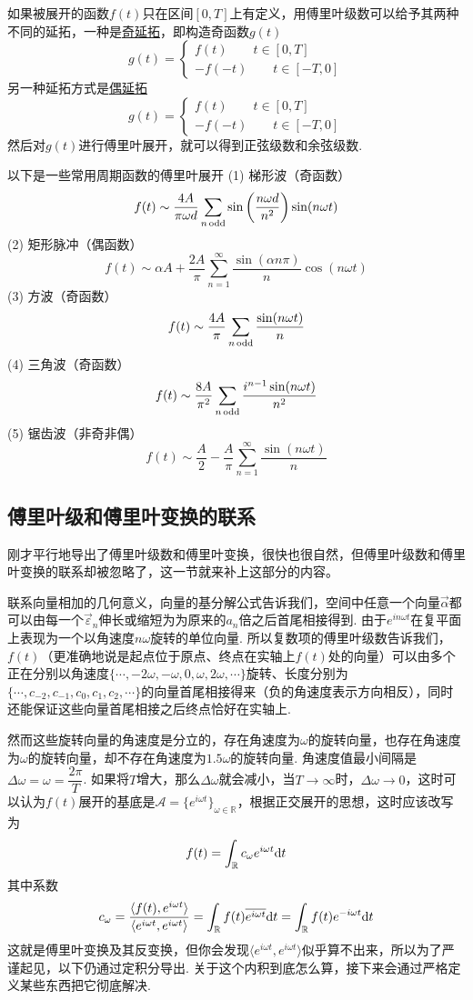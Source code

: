 如果被展开的函数\(f(t)\)只在区间\([0,T]\)上有定义，用傅里叶级数可以给予其两种不同的延拓，一种是\uline{奇延拓}，即构造奇函数\(g(t)\)
\[g(t)=\begin{cases} f(t) \qquad t\in[0,T] \\ -f(-t) \qquad t \in [-T,0]\end{cases}\]
另一种延拓方式是\uline{偶延拓}
\[g(t)=\begin{cases} f(t) \qquad t\in[0,T] \\ -f(-t) \qquad t \in [-T,0]\end{cases}\]
然后对\(g(t)\)进行傅里叶展开，就可以得到正弦级数和余弦级数.

以下是一些常用周期函数的傅里叶展开
\newline
(1) 梯形波（奇函数）
\[f(t)\sim\frac{4A}{\pi\omega d}\sum_{n\,{\rm odd}}\sin\left(\frac{n\omega d}{n^2}\right)\sin(n\omega t)\]
(2) 矩形脉冲（偶函数）
\[f(t)\sim\alpha A + \frac{2A}{\pi}\sum_{n=1}^{\infty}\frac{\sin(\alpha n \pi)}{n} \cos(n\omega t)\]
(3) 方波（奇函数）
\[f(t) \sim \frac{4A}{\pi}\sum_{n\,{\rm odd}} \frac{\sin(n\omega t)}{n}\]
(4) 三角波（奇函数）
\[f(t) \sim \frac{8A}{\pi^2}\sum_{n\,{\rm odd}}\frac{i^{n-1}\sin(n\omega t)}{n^2}\]
(5) 锯齿波（非奇非偶）
\[f(t) \sim \frac{A}{2}-\frac{A}{\pi}\sum_{n=1}^{\infty} \frac{\sin(n\omega t)}{n}\]


\subsection{傅里叶级和傅里叶变换的联系}

刚才平行地导出了傅里叶级数和傅里叶变换，很快也很自然，但傅里叶级数和傅里叶变换的联系却被忽略了，这一节就来补上这部分的内容。

联系向量相加的几何意义，向量的基分解公式告诉我们，空间中任意一个向量\(\vec{\alpha}\)都可以由每一个\(\vec{\varepsilon}_n\)伸长或缩短为为原来的\(a_n\)倍之后首尾相接得到. 由于\(e^{in\omega t}\)在复平面上表现为一个以角速度\(n\omega\)旋转的单位向量. 所以复数项的傅里叶级数告诉我们，\(f(t)\)（更准确地说是起点位于原点、终点在实轴上\(f(t)\)处的向量）可以由多个正在分别以角速度\(\{\cdots, -2\omega, -\omega, 0, \omega, 2\omega, \cdots\}\)旋转、长度分别为\(\{\cdots, c_{-2}, c_{-1}, c_0, c_1, c_2, \cdots\}\)的向量首尾相接得来（负的角速度表示方向相反），同时还能保证这些向量首尾相接之后终点恰好在实轴上.

然而这些旋转向量的角速度是分立的，存在角速度为\(\omega\)的旋转向量，也存在角速度为\(\omega\)的旋转向量，却不存在角速度为\(1.5\omega\)的旋转向量. 角速度值最小间隔是\(\Delta \omega = \omega =\dfrac{2\pi}{T}\). 如果将\(T\)增大，那么\(\Delta \omega\)就会减小，当\(T\to\infty\)时，\(\Delta \omega \to 0\)，这时可以认为\(f(t)\)展开的基底是\(\mathcal{A}=\{e^{i\omega t}\}_{\omega \in \mathbb{R}}\)，根据正交展开的思想，这时应该改写为
\[f(t)=\int_{\mathbb{R}}c_\omega e^{i\omega t}{\rm d}t\]
其中系数
\[c_\omega = \frac{\langle f(t), e^{i\omega t} \rangle}{\langle e^{i\omega t},e^{i \omega t} \rangle} = \int_{\mathbb{R}}f(t)\overline{e^{i\omega t}}{\rm d}t=\int_{\mathbb{R}}f(t)e^{-i\omega t}{\rm d}t\]
这就是傅里叶变换及其反变换，但你会发现\(\langle e^{i\omega t},e^{i \omega t} \rangle\)似乎算不出来，所以为了严谨起见，以下仍通过定积分导出. 关于这个内积到底怎么算，接下来会通过严格定义某些东西把它彻底解决.


